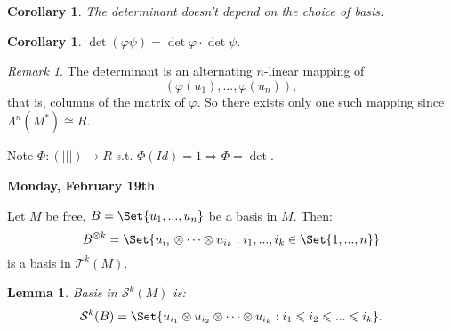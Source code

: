 \documentclass[9pt,reqno,twoside]{amsbook}
\theoremstyle{plain}
\numberwithin{section}{chapter}
\numberwithin{equation}{chapter}
\newtheorem{lem}[theorem]{Lemma}
\newtheorem{Cor}[theorem]{Corollary}
\theoremstyle{definition}
\theoremstyle{remark}
\newtheorem{rem}[theorem]{Remark}
\theoremstyle{plain}
\newcommand{\bb}{\vspace{3mm}}
\newcommand{\mc}{\mathcal}
\newcommand{\tens}{\otimes}
\newcommand{\lpar}{\left(}
\newcommand{\rpar}{\right)}
\renewcommand{\leq}{\leqslant}
\renewcommand{\phi}{\varphi}
\begin{document}
\begin{Cor}
The determinant doesn't depend on the choice of basis. 
\end{Cor}

\begin{Cor}
$\det(\phi\psi) = \det\phi \cdot \det \psi$. 
\end{Cor}

\begin{rem}
The determinant is an alternating $n$-linear mapping of 
$$
(\phi(u_1),...,\phi(u_n)),
$$ 
that is, columns of the matrix of $\phi$. So there exists only one such mapping since $\Lambda^n(M^*) \cong R$. 


\bb\bb

Note $\Phi:\lpar ||| \rpar \to R$ s.t. $\Phi(Id) = 1 \Rightarrow \Phi = \det$. 
\end{rem}

\bb\bb

\textbf{Monday, February 19th}

Let $M$ be free, $B = \Set{u_1,...,u_n}$ be a basis in $M$. Then:
$$
B^{ \tens k} = \Set{u_{i_1}\tens \cdots \tens u_{i_k}:i_1,...,i_k \in \Set{1,...,n}}
$$
 is a basis in $\mc{T}^k(M)$. 

\begin{lem}
Basis in $\mc{S}^k(M)$ is:
 $$
 \mc{S}^k(B) = \Set{u_{i_1} \tens u_{i_2} \tens \cdots \tens u_{i_k}:i_1 \leq i_2 \leq ... \leq i_k}. 
 $$
\end{lem}
\end{document}
